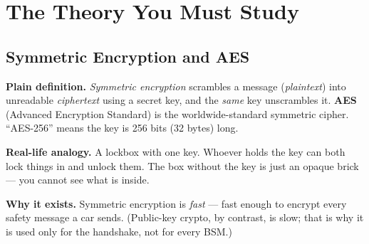 \documentclass[11pt,a4paper]{article}
\begin{document}
\begin{center}
\end{center}

\section{The Theory You Must Study}

\subsection{Symmetric Encryption and AES}
\textbf{Plain definition.} \emph{Symmetric encryption} scrambles a message
(\emph{plaintext}) into unreadable \emph{ciphertext} using a secret key, and the
\emph{same} key unscrambles it. \textbf{AES} (Advanced Encryption Standard) is
the worldwide-standard symmetric cipher. ``AES-256'' means the key is 256 bits
(32 bytes) long.

\textbf{Real-life analogy.} A lockbox with one key. Whoever holds the key can
both lock things in and unlock them. The box without the key is just an opaque
brick --- you cannot see what is inside.

\textbf{Why it exists.} Symmetric encryption is \emph{fast} --- fast enough to
encrypt every safety message a car sends. (Public-key crypto, by contrast, is
slow; that is why it is used only for the handshake, not for every BSM.)
\end{document}
